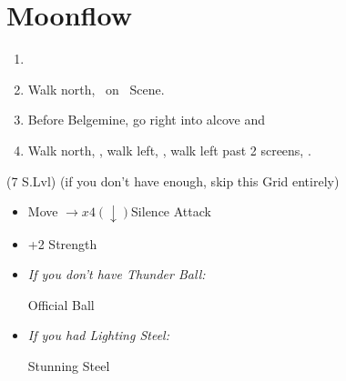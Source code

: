 \chapter{Moonflow}

\begin{enumerate}
	\item \formation{\tidus}{\kimahri}{\auron}
	\item Walk north, \sd\ on \kimahri\ Scene.
	\item Before Belgemine, go right into alcove and 
	\item Walk north, \sd, walk left, \sd, walk left past 2 screens, \sd.
\end{enumerate}
\begin{spheregrid}
	\begin{itemize}
		\wakkaf (7 S.Lvl) (if you don't have enough, skip this Grid entirely)
		\begin{itemize}
			\item Move $\rightarrow x4 (\downarrow)$Silence Attack
			\item +2 Strength
		\end{itemize}
	\end{itemize}
\end{spheregrid}
\begin{equip}
    \begin{itemize}
    	\item \textit{If you don't have Thunder Ball:}
	\begin{itemize}
	\wakkaf Official Ball
	\end{itemize}
	\item \textit{If you had Lighting Steel:}
	\begin{itemize}
	\tidusf Stunning Steel
	\end{itemize}
    \end{itemize}
\end{equip}
